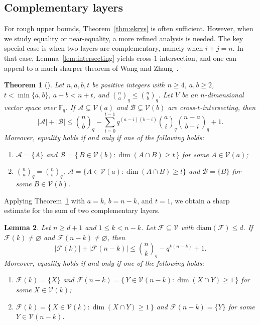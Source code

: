 \documentclass[11pt]{article}
\newtheorem{theorem}{Theorem}[section]
\newtheorem{lemma}[theorem]{Lemma}
\theoremstyle{definition}
\newcommand{\qbinom}[2]{\genfrac{(}{)}{0pt}{}{#1}{#2}_q}
\newcommand{\diam}{\mathrm{diam}}
\begin{document}
\subsection{Complementary layers}

For rough upper bounds, Theorem~\ref{thm:ekrvs} is often sufficient. 
However, when we study equality or near-equality, a more refined analysis is needed. 
The key special case is when two layers are complementary, namely when $i+j=n$. 
In that case, Lemma~\ref{lem:intersecting} yields cross-$1$-intersection, and one can appeal to a much sharper theorem of Wang and Zhang~\cite{WZ2013}.

\begin{theorem}[\cite{WZ2013}]\label{lem:crossintersecting}
Let $n,a,b,t$ be positive integers with
$n\ge 4$, $a,b\ge 2$, $t<\min\{a,b\}$, $a+b<n+t$, and
\(
\qbinom{n}{a}\le \qbinom{n}{b}.
\) Let $V$ be an $n$-dimensional vector space over $\mathbb{F}_q$.
If $\mathcal{A}\subsetneq \mathcal{V}(a)$ and $\mathcal{B}\subsetneq \mathcal{V}(b)$ are cross-$t$-intersecting, then
\begin{equation*}
|\mathcal{A}|+|\mathcal{B}|
\le
\qbinom{n}{b}
-
\sum_{i=0}^{t-1}
q^{(a-i)(b-i)}
\qbinom{a}{i}
\qbinom{n-a}{b-i}
+1.
\end{equation*}
Moreover, equality holds if and only if one of the following holds:
\begin{enumerate}
\item[\textup{(1)}]
$\mathcal{A}=\{A\}$ and
\(
\mathcal{B}
=
\{\,B \in \mathcal{V}(b): \dim(A\cap B)\ge t\,\}
\)
for some $A\in \mathcal{V}(a)$;

\item[\textup{(2)}]
$\qbinom{n}{a}=\qbinom{n}{b}$,
\(
\mathcal{A}
=
\{A \in \mathcal{V}(a): \dim(A\cap B)\ge t\}\)
and \(
\mathcal{B}=\{B\}
\)
for some $B\in \mathcal{V}(b)$.
\end{enumerate}
\end{theorem}

Applying Theorem~\ref{lem:crossintersecting} with $a=k$, $b=n-k$, and $t=1$, we obtain a sharp estimate for the sum of two complementary layers.

\begin{lemma}\label{lem:complementsum-2}
Let $n\ge d+1$ and $1\le k<n-k$. Let $\mathcal{F} \subseteq \mathcal{V}$ with $\diam(\mathcal{F}) \le d$.
If $\mathcal{F}(k)\neq \varnothing$ and $\mathcal{F}(n-k)\neq \varnothing$, then
\[
|\mathcal{F}(k)|+|\mathcal{F}(n-k)|
\le
\qbinom{n}{k}-q^{k(n-k)}+1.
\]
Moreover, equality holds if and only if one of the following holds:
\begin{enumerate}
\item[\textup{(1)}]
$\mathcal{F}(k)=\{X\}$ and
\(
\mathcal{F}(n-k)
=
\{\,Y\in \mathcal{V}(n-k): \dim(X\cap Y)\ge 1\,\}
\)
for some $X\in \mathcal{V}(k)$;

\item[\textup{(2)}]
\(
\mathcal{F}(k)
=
\{\,X\in \mathcal{V}(k): \dim(X\cap Y)\ge 1\,\}
\)
and
\(
\mathcal{F}(n-k)=\{Y\}
\)
for some $Y\in \mathcal{V}(n-k)$.
\end{enumerate}
\end{lemma}
\end{document}
